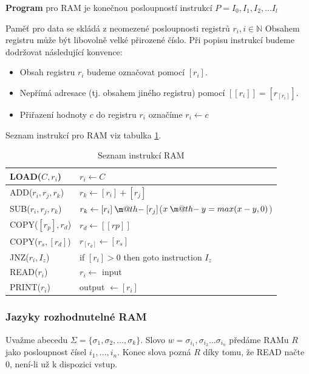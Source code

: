 \documentclass[11pt]{report} %
\makeatletter
\numberwithin{equation}{section}
\newcommand{\dotminus}{\mathbin{\text{\@dotminus}}}
\newcommand{\@dotminus}{%
	\ooalign{\hidewidth\raise1ex\hbox{.}\hidewidth\cr$\m@th-$\cr}%
}
\makeatother
\begin{document}
\textbf{Program} pro RAM je konečnou posloupností instrukcí $P = I_0, I_1, I_2, \dots I_l$

Paměť pro data se skládá z neomezené posloupnosti registrů $r_i, i \in \mathbb{N}$ Obsahem registru může být libovolně velké přirozené číslo. Při popisu instrukcí budeme dodržovat následující konvence:
\begin{itemize}
	
	
	\item Obsah registru $r_i$ budeme označovat pomocí $[r_i]$.
	\item Nepřímá adresace (tj. obsahem jiného registru) pomocí $[[r_i]] = [r_{[r_i]}]$. 
	\item Přiřazení hodnoty $c$ do registru $r_i$ označíme $r_i \leftarrow c$
\end{itemize}

Seznam instrukcí pro RAM viz tabulka \ref{ram_instrukce}.
\begin{table}[H]
	\centering
	\renewcommand{\arraystretch}{1.5}
	\begin{tabular}{|l|l|}
		\hline
		LOAD($C, r_i$) 			& $r_i \leftarrow C$ 							\\ \hline
		ADD($r_i, r_j, r_k$) 	& $r_k \leftarrow [r_i] + [r_j]$				\\ \hline
		SUB($r_i, r_j, r_k$) 	& $r_k \leftarrow [r_i] \dotminus [r_j]$\quad ($x \dotminus y = max(x-y, 0)$)    	\\ \hline
		COPY($[r_p], r_d$) 		& $r_d \leftarrow [[rp]]$				 		\\ \hline
		COPY($r_s,[r_d]$) 		& $r_{[r_d]} \leftarrow [r_s]$                  \\ \hline
		JNZ($r_i, I_z$) 		& if $[r_i] > 0$ then goto instruction $I_z$ 	\\ \hline
		READ($r_i$) 			& $r_i \leftarrow$ input						\\ \hline
		PRINT($r_i$) 			& output $\leftarrow [r_i]$   					\\ \hline
	\end{tabular}
	\caption{Seznam instrukcí RAM}
	\label{ram_instrukce}
\end{table}

\subsubsection{Jazyky rozhodnutelné RAM}
Uvažme abecedu $\Sigma = \{\sigma_1, \sigma_2, \dots, \sigma_k\}$. Slovo $w = \sigma_{i_1}, \sigma_{i_2} \dots \sigma_{i_n}$ předáme RAMu $R$ jako posloupnost čísel $i_1, \dots, i_n$. Konec slova pozná $R$ díky tomu, že READ načte 0, není-li už k dispozici vstup.
\end{document}
